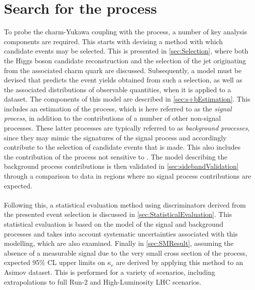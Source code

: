 \chapter{Search for the \cHZZsen process}
\label{chap:cHAnalysis}
To probe the charm-Yukawa coupling with the \cHZZsen process, a number of key analysis components are required. This starts with devising a method with which \cHZZ candidate events may be selected. This is presented in \autoref{sec:Selection}, where both the Higgs boson candidate reconstruction and the selection of the jet originating from the associated charm quark are discussed. Subsequently, a model must be devised that predicts the event yields obtained from such a selection, as well as the associated distributions of observable quantities, when it is applied to a dataset. The components of this model are described in \autoref{sec:s+bEstimation}. This includes an estimation of the \cHZZsen process, which is here referred to as the \textit{signal process}, in addition to the contributions of a number of other non-signal processes. These latter processes are typically referred to as \textit{background processes}, since they may mimic the signatures of the signal process and accordingly contribute to the selection of \cHZZ candidate events that is made. This also includes the contribution of the \cHZZ process not sensitive to \kappac. The model describing the background process contributions is then validated in \autoref{sec:sidebandValidation} through a comparison to data in regions where no signal process contributions are expected. \\
\\ 
Following this, a statistical evaluation method using discriminators derived from the presented event selection is discussed in \autoref{sec:StatisticalEvaluation}. This statistical evaluation is based on the model of the signal and background processes and takes into account systematic uncertainties associated with this modelling, which are also examined. Finally in \autoref{sec:SMResult}, assuming the absence of a measurable signal due to the very small cross section of the \cHZZsen process, expected 95\% CL upper limits on $\kappa_c$ are derived by applying this method to an Asimov dataset. This is performed for a variety of scenarios, including extrapolations to full Run-2 and High-Luminosity LHC scenarios. 
